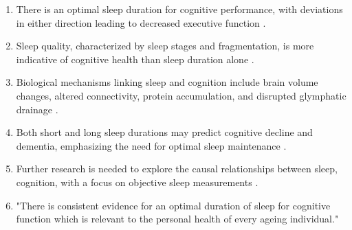 \begin{enumerate}
    \item There is an optimal sleep duration for cognitive performance, with deviations in either direction leading to decreased executive function \parencite[page 804, fig. 1]{2}.

    \item Sleep quality, characterized by sleep stages and fragmentation, is more indicative of cognitive health than sleep duration alone \parencite[page 806, para. 1]{2}.

    \item Biological mechanisms linking sleep and cognition include brain volume changes, altered connectivity, protein accumulation, and disrupted glymphatic drainage \parencite[page 806, para. 8, fig. 2]{2}.

    \item Both short and long sleep durations may predict cognitive decline and dementia, emphasizing the need for optimal sleep maintenance \parencite[page 805, para. 2]{2}.

    \item Further research is needed to explore the causal relationships between sleep, cognition, with a focus on objective sleep measurements \parencite[page 808, para. 1, 3]{2}.

		\item "There is consistent evidence for an optimal duration of sleep for cognitive function which is relevant to the personal health of every ageing individual." \parencite[page 808, para. 2]{2}

\end{enumerate}
